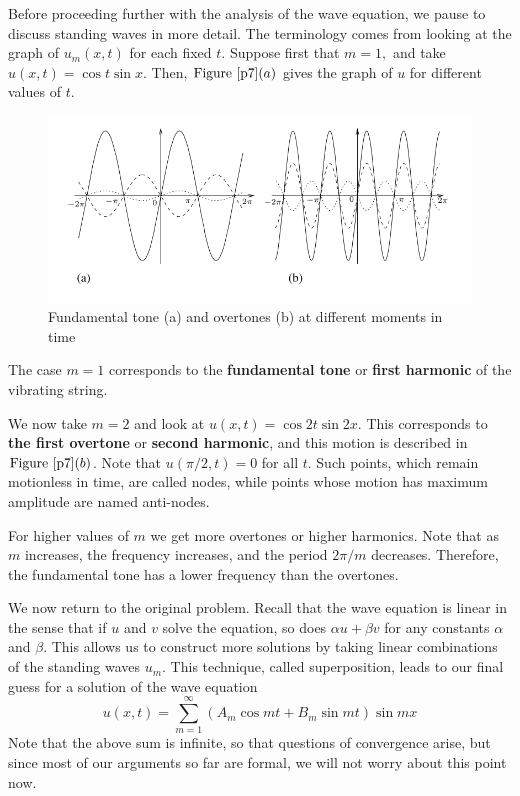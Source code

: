 \documentclass[12pt]{book}
\theoremstyle{definition}\newtheorem{dfn}{Définition}[chapter]
\theoremstyle{plain}\newtheorem{thm}{Théorème}[chapter]
\theoremstyle{plain}\newtheorem{prp}{Proposition}[chapter]
\theoremstyle{plain}\newtheorem{lem}{\bf Lemme}[chapter]
\theoremstyle{plain}\newtheorem{axm}{\bf Axiome}[chapter]
\theoremstyle{plain}\newtheorem{lmm}{\bf Lemme}[chapter]
\theoremstyle{plain}\newtheorem{exm}{\bf Example}[chapter]
\theoremstyle{plain}\newtheorem{cor}{\bf Corollaire}[chapter]
\theoremstyle{remark}\newtheorem{rem}{Remarque}[chapter]
\newcommand{\reffig}[1]{\text{Figure}\ \ref{#1}}
\begin{document}
Before proceeding further with the analysis of the wave equation, we pause to discuss standing waves in more detail. The terminology comes from looking at the graph of $u_{m}(x, t)$ for each fixed $t .$ Suppose first that $m=1,$ and take $u(x, t)=\cos t \sin x .$ Then, $\reffig{p7}(a)$ gives the graph of $u$ for different values of $t$.
\begin{figure}[H]\centering\includegraphics[width=1\textwidth]{image//The Genesis of Fourier Analysis//7}
	\caption{Fundamental tone (a) and overtones (b) at different moments in time}
	\label{p7}	
\end{figure}
The case $m=1$ corresponds to the {\bf fundamental tone} or {\bf first harmonic} of the vibrating string.

We now take $m=2$ and look at $u(x, t)=\cos 2 t \sin 2 x .$ This corresponds to {\bf the first overtone} or {\bf second harmonic}, and this motion is described in $\reffig{p7}(b)$. Note that $u(\pi / 2, t)=0$ for all $t$. Such points, which remain motionless in time, are called nodes, while points whose motion has maximum amplitude are named anti-nodes.

For higher values of $m$ we get more overtones or higher harmonics. Note that as $m$ increases, the frequency increases, and the period $2 \pi / m$ decreases. Therefore, the fundamental tone has a lower frequency than the overtones.

We now return to the original problem. Recall that the wave equation is linear in the sense that if $u$ and $v$ solve the equation, so does $\alpha u+\beta v$ for any constants $\alpha$ and $\beta$. This allows us to construct more solutions by taking linear combinations of the standing waves $u_{m} .$ This technique, called superposition, leads to our final guess for a solution of the wave equation
\begin{equation}
u(x, t)=\sum_{m=1}^{\infty}\left(A_{m} \cos m t+B_{m} \sin m t\right) \sin m x
\end{equation}
Note that the above sum is infinite, so that questions of convergence arise, but since most of our arguments so far are formal, we will not worry about this point now.
\end{document}
